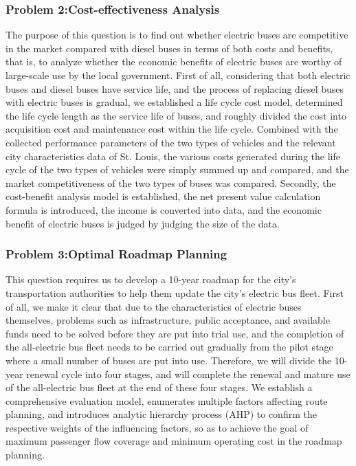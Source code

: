 \documentclass[12pt]{article}
\begin{document}
\subsubsection{Problem 2:Cost-effectiveness Analysis}
The purpose of this question is to find out whether electric buses are competitive in the market compared with diesel buses in terms 
of both costs and benefits, that is, to analyze whether the economic benefits of electric buses are worthy of large-scale use by the 
local government. First of all, considering that both electric buses and diesel buses have service life, and the process of replacing
diesel buses with electric buses is gradual, we established a life cycle cost model, determined the life cycle length as the service 
life of buses, and roughly divided the cost into acquisition cost and maintenance cost within the life cycle. Combined with the 
collected performance parameters of the two types of vehicles and the relevant city characteristics data of St. Louis, the various 
costs generated during the life cycle of the two types of vehicles were simply summed up and compared, and the market competitiveness 
of the two types of buses was compared. Secondly, the cost-benefit analysis model is established, the net present value calculation 
formula is introduced, the income is converted into data, and the economic benefit of electric buses is judged by judging the size of 
the data.

\subsubsection{Problem 3:Optimal Roadmap Planning}
This question requires us to develop a 10-year roadmap for the city's transportation authorities to help them update the city's 
electric bus fleet. First of all, we make it clear that due to the characteristics of electric buses themselves, problems such as 
infrastructure, public acceptance, and available funds need to be solved before they are put into trial use, and the completion of 
the all-electric bus fleet needs to be carried out gradually from the pilot stage where a small number of buses are put into use. 
Therefore, we will divide the 10-year renewal cycle into four stages, and will complete the renewal and mature use of the all-electric 
bus fleet at the end of these four stages. We establish a comprehensive evaluation model, enumerates multiple factors affecting route 
planning, and introduces analytic hierarchy process (AHP) to confirm the respective weights of the influencing factors, so as to 
achieve the goal of maximum passenger flow coverage and minimum operating cost in the roadmap planning.
\end{document}
